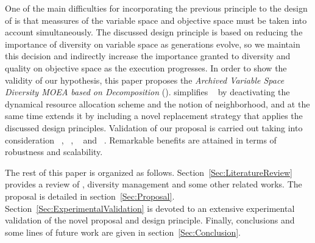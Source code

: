 One of the main difficulties for incorporating the previous principle to the design of \MOEAS{} is that
meassures of the variable space and objective space must be taken into account simultaneously.
%
The discussed design principle is based on reducing the importance of diversity on variable space as 
generations evolve, so we maintain this decision and indirectly increase the importance granted to diversity 
and quality on objective space as the execution progresses.
%
%
In order to show the validity of our hypothesis, this paper proposes the
\textit{Archived Variable Space Diversity MOEA based on Decomposition} (\AVSDMOEAD{}).
%
\AVSDMOEAD{} simplifies \MOEADDE{}~\cite{zhang2009performance} by deactivating the dynamical resource allocation
scheme and the notion of neighborhood,
and at the same
time extends it by including a novel replacement strategy that applies the discussed design principles.
%
Validation of our proposal is carried out taking into consideration 
\MOEADDE{}~\cite{zhang2009performance}, 
\NSGAII{}~\cite{deb2002fast}, 
\REMOA{}~\cite{trautmann2013r2} and 
\NSGAIII{}~\cite{deb2013evolutionary}.
%
Remarkable benefits are attained in terms of robustness and scalability.

The rest of this paper is organized as follows.
%
Section~\ref{Sec:LiteratureReview} provides a review of \MOEAS{}, diversity management 
and some other related works.
%
The \AVSDMOEAD{} proposal is detailed in section~\ref{Sec:Proposal}.
%
Section~\ref{Sec:ExperimentalValidation} is devoted to an extensive experimental validation of the novel proposal and
design principle.
%
Finally, conclusions and some lines of future work are given in section~\ref{Sec:Conclusion}.
%
